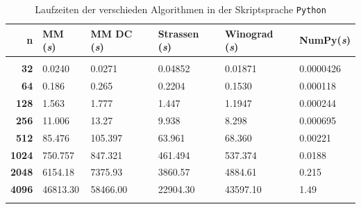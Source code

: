 	 \begin{table}
	 			 \begin{center}
	 					 \begin{tabular}{r l l l l l}
	 							 \hline
	 							 \hline
	 							 \textbf{n} & \textbf{MM (\textit{s})} &  \textbf{MM DC (\textit{s})} & \textbf{Strassen (\textit{s})}  & \textbf{Winograd (\textit{s})} & \textbf{NumPy(\textit{s})} \\
	 							 \hline
	 							 \multicolumn{6}{c}{} \\
	 							 \textbf{32}   &\phantom{0000}0.0240     & \phantom{0000}0.0271& \phantom{0000}0.04852 & \phantom{0000}0.01871 & 0.0000426  \\
	 							 \textbf{64}   &\phantom{0000}0.186      & \phantom{0000}0.265 & \phantom{0000}0.2204  & \phantom{0000}0.1530& 0.000118 \\
	 							 \textbf{128}  &\phantom{0000}1.563      & \phantom{0000}1.777 & \phantom{0000}1.447   & \phantom{0000}1.1947 & 0.000244 \\
	 							 \textbf{256}  &\phantom{000}11.006      & \phantom{000}13.27  & \phantom{0000}9.938   & \phantom{0000}8.298& 0.000695 \\
	 							 \textbf{512}  &\phantom{000}85.476      & \phantom{00}105.397 & \phantom{000}63.961   & \phantom{000}68.360 &  0.00221\\
	 							 \textbf{1024} &\phantom{00}750.757      & \phantom{00}847.321 & \phantom{00}461.494   & \phantom{00}537.374 & 0.0188 \\
								 \textbf{2048} &\phantom{0}6154.18                 & \phantom{0}7375.93  & \phantom{0}3860.57    & \phantom{0}4884.61 & 0.215 \\
								 \textbf{4096} & 46813.30                 & 58466.00               & 22904.30               & 43597.10 & 1.49 \\
	 							 \multicolumn{6}{c}{} \\
	 							 \hline
	 							 \hline
	 					 \end{tabular}
	 			 \end{center}
	 			 \caption{Laufzeiten der verschieden Algorithmen in der Skriptsprache \texttt{Python}}
	 			 \label{multiplikation:tab:messung_Python}
	 	 \end{table}

